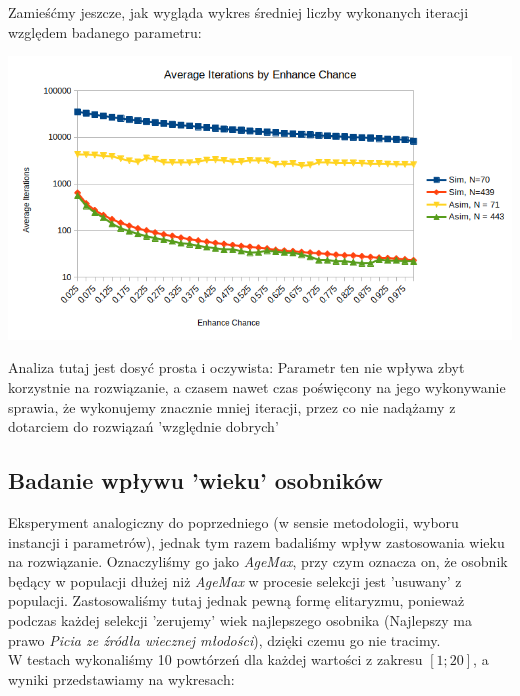 \documentclass{article}
\begin{document}
Zamieśćmy jeszcze, jak wygląda wykres średniej liczby wykonanych iteracji względem badanego parametru:

\includegraphics[scale=0.72]{locEnhIter}

Analiza tutaj jest dosyć prosta i oczywista: Parametr ten nie wpływa zbyt korzystnie na rozwiązanie, a czasem nawet czas poświęcony na jego wykonywanie sprawia, że wykonujemy znacznie mniej iteracji, przez co nie nadążamy z dotarciem do rozwiązań 'względnie dobrych'

\subsection{Badanie wpływu 'wieku' osobników}
Eksperyment analogiczny do poprzedniego (w sensie metodologii, wyboru instancji i parametrów), jednak tym razem badaliśmy wpływ zastosowania wieku na rozwiązanie. Oznaczyliśmy go jako \textit{AgeMax}, przy czym oznacza on, że osobnik będący w populacji dłużej niż \textit{AgeMax} w procesie selekcji jest 'usuwany' z populacji. Zastosowaliśmy tutaj jednak pewną formę elitaryzmu, ponieważ podczas każdej selekcji 'zerujemy' wiek najlepszego osobnika (Najlepszy ma prawo \textit{Picia ze źródła wiecznej młodości}), dzięki czemu go nie tracimy.\\
W testach wykonaliśmy 10 powtórzeń dla każdej wartości z zakresu $[1 ; 20]$, a wyniki przedstawiamy na wykresach:
\end{document}
